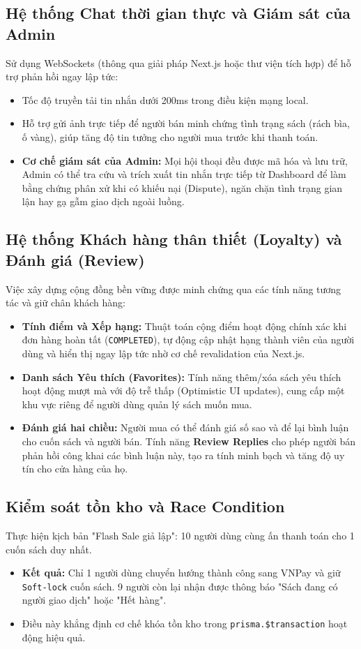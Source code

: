 \documentclass[../main.tex]{subfiles}
\begin{document}
\subsection{Hệ thống Chat thời gian thực và Giám sát của Admin}
Sử dụng WebSockets (thông qua giải pháp Next.js hoặc thư viện tích hợp) để hỗ trợ phản hồi ngay lập tức:
\begin{itemize}
    \item Tốc độ truyền tải tin nhắn dưới 200ms trong điều kiện mạng local.
    \item Hỗ trợ gửi ảnh trực tiếp để người bán minh chứng tình trạng sách (rách bìa, ố vàng), giúp tăng độ tin tưởng cho người mua trước khi thanh toán.
    \item \textbf{Cơ chế giám sát của Admin:} Mọi hội thoại đều được mã hóa và lưu trữ, Admin có thể tra cứu và trích xuất tin nhắn trực tiếp từ Dashboard để làm bằng chứng phân xử khi có khiếu nại (Dispute), ngăn chặn tình trạng gian lận hay gạ gẫm giao dịch ngoài luồng.
\end{itemize}

\subsection{Hệ thống Khách hàng thân thiết (Loyalty) và Đánh giá (Review)}
Việc xây dựng cộng đồng bền vững được minh chứng qua các tính năng tương tác và giữ chân khách hàng:
\begin{itemize}
    \item \textbf{Tính điểm và Xếp hạng:} Thuật toán cộng điểm hoạt động chính xác khi đơn hàng hoàn tất (\texttt{COMPLETED}), tự động cập nhật hạng thành viên của người dùng và hiển thị ngay lập tức nhờ cơ chế revalidation của Next.js.
    \item \textbf{Danh sách Yêu thích (Favorites):} Tính năng thêm/xóa sách yêu thích hoạt động mượt mà với độ trễ thấp (Optimistic UI updates), cung cấp một khu vực riêng để người dùng quản lý sách muốn mua.
    \item \textbf{Đánh giá hai chiều:} Người mua có thể đánh giá số sao và để lại bình luận cho cuốn sách và người bán. Tính năng \textbf{Review Replies} cho phép người bán phản hồi công khai các bình luận này, tạo ra tính minh bạch và tăng độ uy tín cho cửa hàng của họ.
\end{itemize}

\subsection{Kiểm soát tồn kho và Race Condition}
Thực hiện kịch bản "Flash Sale giả lập": 10 người dùng cùng ấn thanh toán cho 1 cuốn sách duy nhất. 
\begin{itemize}
    \item \textbf{Kết quả:} Chỉ 1 người dùng chuyển hướng thành công sang VNPay và giữ \texttt{Soft-lock} cuốn sách. 9 người còn lại nhận được thông báo "Sách đang có người giao dịch" hoặc "Hết hàng". 
    \item Điều này khẳng định cơ chế khóa tồn kho trong \texttt{prisma.\$transaction} hoạt động hiệu quả.
\end{itemize}
\end{document}
